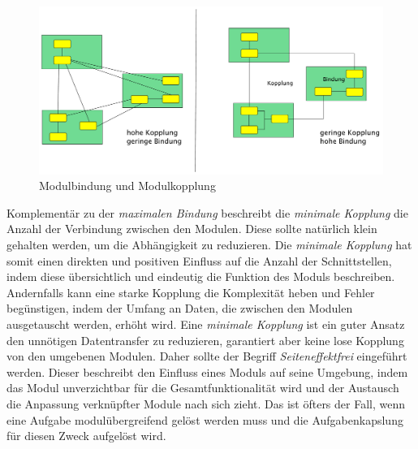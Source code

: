     \begin{figure}[h]
      \includegraphics[width=\textwidth]{material/images/kopplung.pdf}
      \caption{Modulbindung und Modulkopplung \cite{modulMitJava9}}
      \label{fig:kopplung}
    \end{figure}

    Komplementär zu der \textit{maximalen Bindung} beschreibt die \textit{minimale Kopplung} die Anzahl der Verbindung zwischen den Modulen. Diese sollte natürlich klein gehalten werden, um die Abhängigkeit zu reduzieren. Die \textit{minimale Kopplung} hat somit einen direkten und positiven Einfluss auf die Anzahl der Schnittstellen, indem diese übersichtlich und eindeutig die Funktion des Moduls beschreiben. Andernfalls kann eine starke Kopplung die Komplexität heben und Fehler begünstigen, indem der Umfang an Daten, die zwischen den Modulen ausgetauscht werden, erhöht wird. Eine \textit{minimale Kopplung} ist ein guter Ansatz den unnötigen Datentransfer zu reduzieren, garantiert aber keine lose Kopplung von den umgebenen Modulen. Daher sollte der Begriff \textit{Seiteneffektfrei} eingeführt werden. Dieser beschreibt den Einfluss eines Moduls auf seine Umgebung, indem das Modul unverzichtbar für die Gesamtfunktionalität wird und der Austausch die Anpassung verknüpfter Module nach sich zieht. Das ist öfters der Fall, wenn eine Aufgabe modulübergreifend gelöst werden muss und die Aufgabenkapslung für diesen Zweck aufgelöst wird.\cite{softModDes,softMdDes2,modulMitJava9,java9modRevealed,modulProgJava9}

